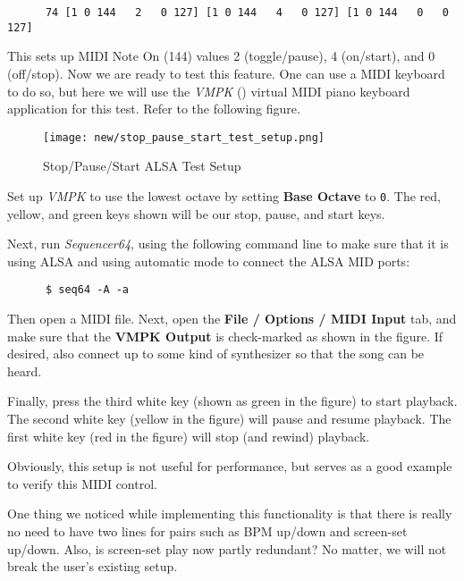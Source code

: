    \begin{verbatim}
      74 [1 0 144   2   0 127] [1 0 144   4   0 127] [1 0 144   0   0 127]
   \end{verbatim}

   This sets up MIDI Note On (144) values 2 (toggle/pause), 4 (on/start), and 0
   (off/stop).
   Now we are ready to test this feature.  One can use a MIDI keyboard to do
   so, but here we will use the \textsl{VMPK} (\cite{vmpk}) virtual MIDI
   piano keyboard application for this test.  Refer to the following figure.

\begin{figure}[H]
   \centering 
   \texttt{[image: new/stop\_pause\_start\_test\_setup.png]}
   \caption{Stop/Pause/Start ALSA Test Setup}
   \label{fig:rc_file_stop_pause_start_alsa_test_setup}
\end{figure}

   Set up \textsl{VMPK} to use the lowest octave by setting
   \textbf{Base Octave} to \texttt{0}.  The red, yellow, and green
   keys shown will be our stop, pause, and start keys.

   Next, run \textsl{Sequencer64}, using the following command line to make
   sure that it is using ALSA and using automatic mode to connect the ALSA MID
   ports:

   \begin{verbatim}
      $ seq64 -A -a
   \end{verbatim}
   
   Then open a MIDI file.  Next,
   open the \textbf{File / Options / MIDI Input} tab, and make sure that
   the \textbf{VMPK Output} is check-marked as shown in the figure.
   If desired, also connect up to some kind of synthesizer so that the song can
   be heard.

   Finally, press the third white key (shown as green in the figure) to start
   playback.  The second white key (yellow in the figure) will pause and resume
   playback.  The first white key (red in the figure) will stop (and rewind)
   playback.

   Obviously, this setup is not useful for performance, but serves as a good
   example to verify this MIDI control.

   One thing we noticed while implementing this functionality is that there
   is really no need to have two lines for pairs such as BPM up/down and
   screen-set up/down.  Also, is screen-set play now partly redundant?
   No matter, we will not break the user's existing setup.

